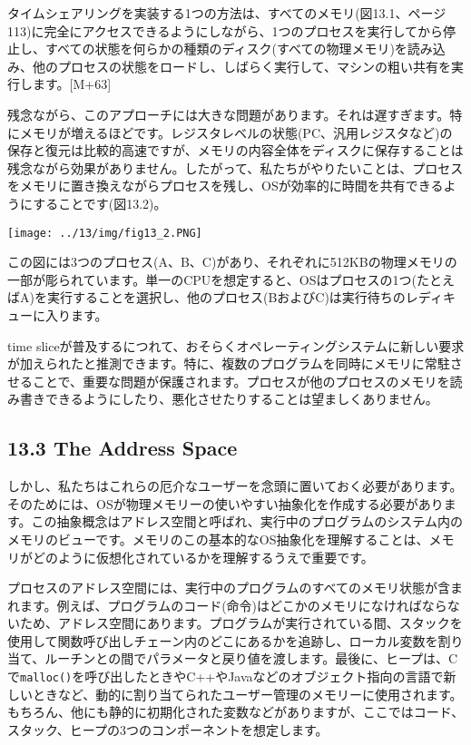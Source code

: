 タイムシェアリングを実装する1つの方法は、すべてのメモリ(図13.1、ページ113)に完全にアクセスできるようにしながら、1つのプロセスを実行してから停止し、すべての状態を何らかの種類のディスク(すべての物理メモリ)を読み込み、他のプロセスの状態をロードし、しばらく実行して、マシンの粗い共有を実行します。{[}M+63{]}

残念ながら、このアプローチには大きな問題があります。それは遅すぎます。特にメモリが増えるほどです。レジスタレベルの状態(PC、汎用レジスタなど)の保存と復元は比較的高速ですが、メモリの内容全体をディスクに保存することは残念ながら効果がありません。したがって、私たちがやりたいことは、プロセスをメモリに置き換えながらプロセスを残し、OSが効率的に時間を共有できるようにすることです(図13.2)。

\texttt{[image: ../13/img/fig13\_2.PNG]}

この図には3つのプロセス(A、B、C)があり、それぞれに512KBの物理メモリの一部が彫られています。単一のCPUを想定すると、OSはプロセスの1つ(たとえばA)を実行することを選択し、他のプロセス(BおよびC)は実行待ちのレディキューに入ります。

time
sliceが普及するにつれて、おそらくオペレーティングシステムに新しい要求が加えられたと推測できます。特に、複数のプログラムを同時にメモリに常駐させることで、重要な問題が保護されます。プロセスが他のプロセスのメモリを読み書きできるようにしたり、悪化させたりすることは望ましくありません。

\hypertarget{the-address-space}{%
\subsection*{13.3 The Address Space}\label{the-address-space}}

しかし、私たちはこれらの厄介なユーザーを念頭に置いておく必要があります。そのためには、OSが物理メモリーの使いやすい抽象化を作成する必要があります。この抽象概念はアドレス空間と呼ばれ、実行中のプログラムのシステム内のメモリのビューです。メモリのこの基本的なOS抽象化を理解することは、メモリがどのように仮想化されているかを理解するうえで重要です。

プロセスのアドレス空間には、実行中のプログラムのすべてのメモリ状態が含まれます。例えば、プログラムのコード(命令)はどこかのメモリになければならないため、アドレス空間にあります。プログラムが実行されている間、スタックを使用して関数呼び出しチェーン内のどこにあるかを追跡し、ローカル変数を割り当て、ルーチンとの間でパラメータと戻り値を渡します。最後に、ヒープは、Cで\texttt{malloc()}を呼び出したときやC++やJavaなどのオブジェクト指向の言語で新しいときなど、動的に割り当てられたユーザー管理のメモリーに使用されます。もちろん、他にも静的に初期化された変数などがありますが、ここではコード、スタック、ヒープの3つのコンポーネントを想定します。

